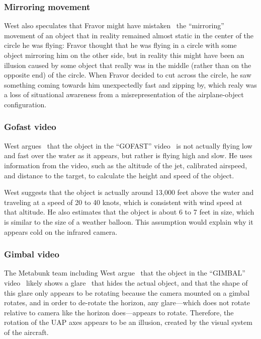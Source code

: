 \subsubsection{Mirroring movement}

West also speculates that Fravor might have mistaken~\cite{WestFravorWest2020Sep,WestAlexDietrich2021Jun} the ``mirroring'' movement of an object that in reality remained almost
static in the center of the circle he was flying:
Fravor thought that he was  flying in a circle with some object mirroring him on the other side,
but in reality this might have been an illusion caused by some object that really was in the middle (rather than on the opposite end) of the circle.
When Fravor decided to cut across the circle, he saw something coming towards him unexpectedly fast and zipping by,
which realy was a loss of situational awareness from a misrepresentation of the airplane-object configuration.

\subsubsection{Gofast video}

West argues~\cite{West2022Nov,West2019Jun} that the object in the ``GOFAST'' video~\cite{NAVAIRFOIAGOFAST2020Apr}
is not actually flying low and fast over the water as it appears, but rather is flying high and slow.
He uses information from the video, such as the altitude of the jet, calibrated airspeed,
and distance to the target, to calculate the height and speed of the object.

West suggests that the object is actually around 13,000 feet above the water and traveling at a speed of 20 to 40 knots,
which is consistent with wind speed at that altitude. He also estimates that the object is about 6 to 7 feet in size,
which is similar to the size of a weather balloon.
This assumption would explain why it appears cold on the infrared camera.

\subsubsection{Gimbal video}

The Metabunk team including West argue~\cite{markus2022Sep,West2022Nov,West2022Mar,WestFravorWest2020Sep} that the object in the ``GIMBAL'' video~\cite{NAVAIRFOIAGIMBAL2020Apr}
likely shows a glare~\cite{Talvala_2007} that hides the actual object, and that the shape of this glare only appears to be rotating because
the camera mounted on a gimbal rotates, and in order to de-rotate the horizon, any glare---which does not rotate relative to camera like the horizon does---appears to rotate.
Therefore, the rotation of the UAP axes appears to be an illusion, created by the visual system of the aircraft.

